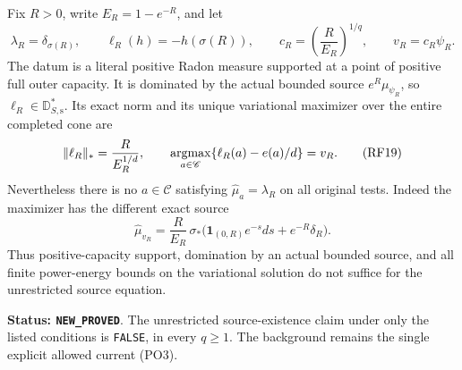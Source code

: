 \begin{theorem}
\label{thm:r12-positive-capacity-atom-source-obstruction}
Fix $R>0$, write $E_R=1-e^{-R}$, and let
\[
 \lambda_R=\delta_{\sigma(R)},\qquad
 \ell_R(h)=-h(\sigma(R)),\qquad
 c_R=\left(\frac R{E_R}\right)^{1/q},\qquad
 v_R=c_R\psi_R.
 \tag{RF18}
\]
The datum is a literal positive Radon measure supported
at a point of positive full outer capacity.  It is
dominated by the actual bounded source
$e^R\mu_{\psi_R}$, so $\ell_R\in\mathbb D_{S,\mathrm s}^*$.
Its exact norm and its unique variational maximizer
over the entire completed cone are
\[
       \|\ell_R\|_* =\frac R{E_R^{1/d}},\qquad
       \mathop{\rm argmax}_{a\in\mathscr C}
                  \{\ell_R(a)-e(a)/d\}=v_R.
 \tag{RF19}
\]
Nevertheless there is no $a\in\mathscr C$ satisfying
$\widehat\mu_a=\lambda_R$ on all original tests.
Indeed the maximizer has the different exact source
\[
 \widehat\mu_{v_R}
     =\frac R{E_R}\,
           \sigma_*\bigl(\mathbf1_{(0,R)}e^{-s}ds+e^{-R}\delta_R\bigr).
 \tag{RF20}
\]
Thus positive-capacity support, domination by an actual
bounded source, and all finite power-energy bounds on
the variational solution do not suffice for the
unrestricted source equation.
\end{theorem}

\noindent\textbf{Status: \texttt{NEW\_PROVED}}.  The
unrestricted source-existence claim under only the
listed conditions is \texttt{FALSE}, in every $q\ge1$.
The background remains the single explicit allowed
current \textup{(PO3)}.

